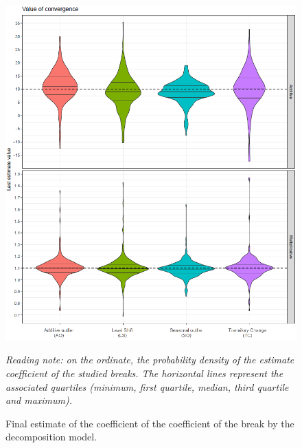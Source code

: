 \documentclass[12pt, a4paper]{article}
\begin{document}
\begin{figure}[!ht]
\begin{center}
 \includegraphics[scale=0.65]{img/OutliersValue.png}
 \caption[Final estimate of the coefficient of the coefficient of the break by the decomposition model]{Final estimate of the coefficient of the coefficient of the break by the decomposition model.}
 \label{fig:OutliersValue}
\end{center}\vspace{-0.3cm}
\footnotesize%
\emph{%
Reading note: on the ordinate, the probability density of the estimate coefficient of the studied breaks. The horizontal lines represent the associated quartiles (minimum, first quartile, median, third quartile and maximum).}
\end{figure}

\clearpage
\end{document}
